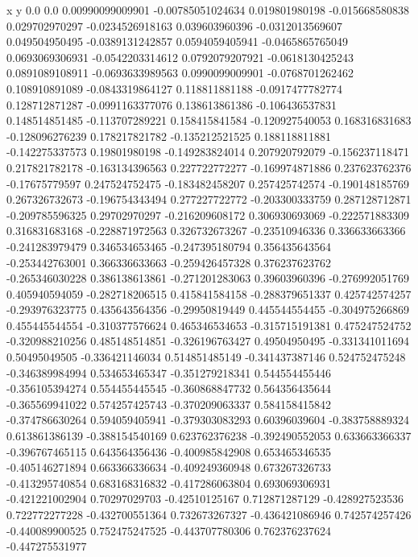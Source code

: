               x                y
            0.0              0.0
0.00990099009901  -0.00785051024634
 0.019801980198  -0.015668580838
 0.029702970297  -0.0234526918163
 0.039603960396  -0.0312013569607
 0.049504950495  -0.0389131242857
0.0594059405941  -0.0465865765049
0.0693069306931  -0.0542203314612
0.0792079207921  -0.0618130425243
0.0891089108911  -0.0693633989563
0.0990099009901  -0.0768701262462
 0.108910891089  -0.0843319864127
 0.118811881188  -0.0917477782774
 0.128712871287  -0.0991163377076
 0.138613861386  -0.106436537831
 0.148514851485  -0.113707289221
 0.158415841584  -0.120927540053
 0.168316831683  -0.128096276239
 0.178217821782  -0.135212521525
 0.188118811881  -0.142275337573
  0.19801980198  -0.149283824014
 0.207920792079  -0.156237118471
 0.217821782178  -0.163134396563
 0.227722772277  -0.169974871886
 0.237623762376   -0.17675779597
 0.247524752475  -0.183482458207
 0.257425742574  -0.190148185769
 0.267326732673  -0.196754343494
 0.277227722772  -0.203300333759
 0.287128712871  -0.209785596325
  0.29702970297  -0.216209608172
 0.306930693069  -0.222571883309
 0.316831683168  -0.228871972563
 0.326732673267   -0.23510946336
 0.336633663366  -0.241283979479
 0.346534653465  -0.247395180794
 0.356435643564  -0.253442763001
 0.366336633663  -0.259426457328
 0.376237623762  -0.265346030228
 0.386138613861  -0.271201283063
  0.39603960396  -0.276992051769
 0.405940594059  -0.282718206515
 0.415841584158  -0.288379651337
 0.425742574257  -0.293976323775
 0.435643564356   -0.29950819449
 0.445544554455  -0.304975266869
 0.455445544554  -0.310377576624
 0.465346534653  -0.315715191381
 0.475247524752  -0.320988210256
 0.485148514851  -0.326196763427
  0.49504950495  -0.331341011694
  0.50495049505  -0.336421146034
 0.514851485149  -0.341437387146
 0.524752475248  -0.346389984994
 0.534653465347  -0.351279218341
 0.544554455446  -0.356105394274
 0.554455445545  -0.360868847732
 0.564356435644  -0.365569941022
 0.574257425743  -0.370209063337
 0.584158415842  -0.374786630264
 0.594059405941  -0.379303083293
  0.60396039604  -0.383758889324
 0.613861386139  -0.388154540169
 0.623762376238  -0.392490552053
 0.633663366337  -0.396767465115
 0.643564356436  -0.400985842908
 0.653465346535  -0.405146271894
 0.663366336634  -0.409249360948
 0.673267326733  -0.413295740854
 0.683168316832  -0.417286063804
 0.693069306931  -0.421221002904
  0.70297029703   -0.42510125167
 0.712871287129  -0.428927523536
 0.722772277228  -0.432700551364
 0.732673267327  -0.436421086946
 0.742574257426  -0.440089900525
 0.752475247525  -0.443707780306
 0.762376237624  -0.447275531977
